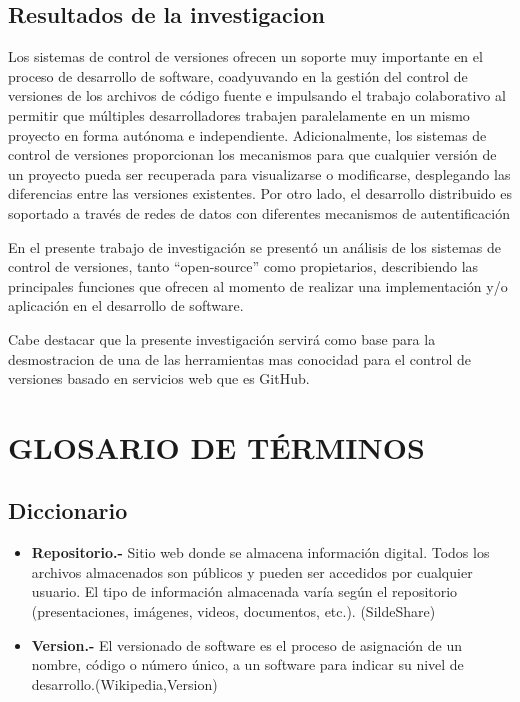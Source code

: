 \documentclass[a4paper,12pt]{article}
\begin{document}
{\subsection{Resultados de la investigacion}

	Los sistemas de control de versiones ofrecen un soporte muy importante en el proceso de desarrollo de software, coadyuvando en la gestión del control de versiones de los archivos de código fuente e impulsando el trabajo colaborativo al permitir que múltiples desarrolladores trabajen paralelamente en un mismo proyecto en forma autónoma e independiente.
	Adicionalmente, los sistemas de control de versiones proporcionan los mecanismos para que cualquier versión de un proyecto pueda ser recuperada para visualizarse o modificarse, desplegando las diferencias entre las versiones existentes. Por otro lado, el desarrollo distribuido es soportado a través de redes de datos con diferentes mecanismos de autentificación
	
	En el presente trabajo de investigación se presentó un análisis de los sistemas de control de versiones, tanto “open-source” como propietarios, describiendo las principales funciones que ofrecen al momento de realizar una implementación y/o aplicación en el desarrollo de software.
	
	Cabe destacar que la presente investigación servirá como base para la desmostracion de una de las herramientas mas conocidad para el control de versiones basado en servicios web que es GitHub.


\section{GLOSARIO DE TÉRMINOS}
\subsection{Diccionario}
\begin{itemize}
	\item \textbf{Repositorio.- } Sitio web donde se almacena información digital. Todos los archivos almacenados son públicos y pueden ser accedidos por cualquier usuario. El tipo de información almacenada varía según el repositorio (presentaciones, imágenes, videos, documentos, etc.). (SildeShare)
	
	\item \textbf{Version.- } El versionado de software es el proceso de asignación de un nombre, código o número único, a un software para indicar su nivel de desarrollo.(Wikipedia,Version)
	

\end{itemize}}
\end{document}
